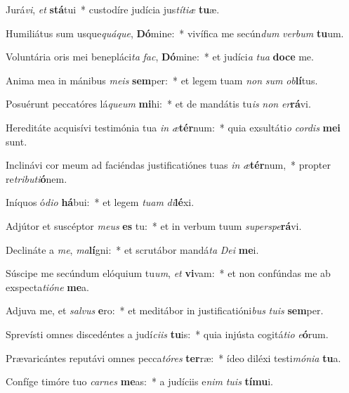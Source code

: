 \item Jurá\textit{vi}, \textit{et} \textbf{stá}tui~* custodíre judícia jus\textit{tí}\textit{ti}\textit{æ} \textbf{tu}æ.
\item Humiliátus sum usque\textit{quá}\textit{que}, \textbf{Dó}mine:~* vivífica me secún\textit{dum} \textit{ver}\textit{bum} \textbf{tu}um.
\item Voluntária oris mei benepláci\textit{ta} \textit{fac}, \textbf{Dó}mine:~* et judíci\textit{a} \textit{tu}\textit{a} \textbf{do}\textbf{ce} me.
\item Anima mea in mánibus \textit{me}\textit{is} \textbf{sem}per:~* et legem tuam \textit{non} \textit{sum} \textit{ob}\textbf{lí}tus.
\item Posuérunt peccatóres lá\textit{que}\textit{um} \textbf{mi}hi:~* et de mandátis tu\textit{is} \textit{non} \textit{er}\textbf{rá}vi.
\item Hereditáte acquisívi testimónia tua \textit{in} \textit{æ}\textbf{tér}num:~* quia exsultáti\textit{o} \textit{cor}\textit{dis} \textbf{me}\textbf{i} sunt.
\item Inclinávi cor meum ad faciéndas justificatiónes tuas \textit{in} \textit{æ}\textbf{tér}num,~* propter re\textit{tri}\textit{bu}\textit{ti}\textbf{ó}nem.
\item Iníquos ó\textit{di}\textit{o} \textbf{há}bui:~* et legem \textit{tu}\textit{am} \textit{di}\textbf{lé}xi.
\item Adjútor et suscéptor \textit{me}\textit{us} \textbf{es} tu:~* et in verbum tuum \textit{su}\textit{per}\textit{spe}\textbf{rá}vi.
\item Declináte a \textit{me}, \textit{ma}\textbf{lí}gni:~* et scrutábor mandá\textit{ta} \textit{De}\textit{i} \textbf{me}i.
\item Súscipe me secúndum elóquium tu\textit{um}, \textit{et} \textbf{vi}vam:~* et non confúndas me ab exspecta\textit{ti}\textit{ó}\textit{ne} \textbf{me}a.
\item Adjuva me, et \textit{sal}\textit{vus} \textbf{e}ro:~* et meditábor in justificatióni\textit{bus} \textit{tu}\textit{is} \textbf{sem}per.
\item Sprevísti omnes discedéntes a judí\textit{ci}\textit{is} \textbf{tu}is:~* quia injústa cogitá\textit{ti}\textit{o} \textit{e}\textbf{ó}rum.
\item Prævaricántes reputávi omnes pecca\textit{tó}\textit{res} \textbf{ter}ræ:~* ídeo diléxi testi\textit{mó}\textit{ni}\textit{a} \textbf{tu}a.
\item Confíge timóre tuo \textit{car}\textit{nes} \textbf{me}as:~* a judíciis e\textit{nim} \textit{tu}\textit{is} \textbf{tí}\textbf{mu}i.
